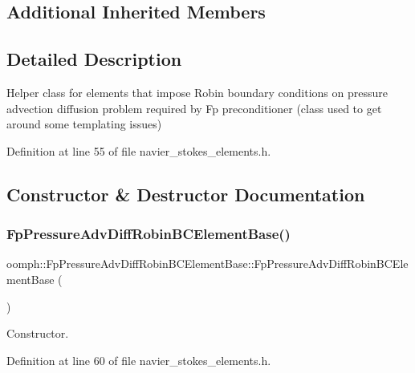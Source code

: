 \subsection*{Additional Inherited Members}


\subsection{Detailed Description}
Helper class for elements that impose Robin boundary conditions on pressure advection diffusion problem required by Fp preconditioner (class used to get around some templating issues) 

Definition at line 55 of file navier\+\_\+stokes\+\_\+elements.\+h.



\subsection{Constructor \& Destructor Documentation}
\mbox{\label{classoomph_1_1FpPressureAdvDiffRobinBCElementBase_a046874815cbcb8bf367877a60a3ce170}} 
\subsubsection{\texorpdfstring{Fp\+Pressure\+Adv\+Diff\+Robin\+B\+C\+Element\+Base()}{FpPressureAdvDiffRobinBCElementBase()}}
{\footnotesize\ttfamily oomph\+::\+Fp\+Pressure\+Adv\+Diff\+Robin\+B\+C\+Element\+Base\+::\+Fp\+Pressure\+Adv\+Diff\+Robin\+B\+C\+Element\+Base (\begin{DoxyParamCaption}{ }\end{DoxyParamCaption})\hspace{0.3cm}{\ttfamily [inline]}}



Constructor. 



Definition at line 60 of file navier\+\_\+stokes\+\_\+elements.\+h.

